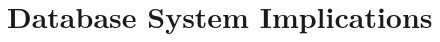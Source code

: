\begin{comment}
http://docs.oracle.com/javaee/6/api/javax/persistence/UniqueConstraint.html

BEAN supported
https://jcp.org/en/jsr/detail?id=303

supports udf validations
http://book.cakephp.org/2.0/en/models/data-validation.html

basically you set up your own schema, but default validations don't
appear to be transactional




https://github.com/cakephp/cakephp/blob/50b3893e6507979427e1aaeb435494aed1af4f52/lib/Cake/Model/Model.php#L3303



Manually define database schema!


http://laravel.com/docs/4.2/validation#rule-unique
https://github.com/laravel/framework/blob/75b1dff27778354e44511556171cf6ae466c8b59/src/Illuminate/Validation/Validator.php#L940


http://laravelbook.com/laravel-input-validation/


Validations are handled by Anchor, a thin layer on top of Validator, one of the most robust validation libraries for Node.js. Sails supports most of the validations available in Validator, as well as a few extras that require database integration, like unique.

http://sailsjs.org/#/documentation/concepts/ORM/Validations.html
https://github.com/balderdashy/sails/issues/832

https://github.com/balderdashy/waterline

Broken in Mongo
https://github.com/balderdashy/sails-mongo/issues/152

Broken in dev
https://github.com/balderdashy/waterline/issues/55

Because you have migrate: safe set the indexes will not be created when you start the ORM.
https://github.com/balderdashy/waterline/issues/236

uses db foreign keys

\end{comment}




\section{Database System Implications}
\label{sec:discussion}


